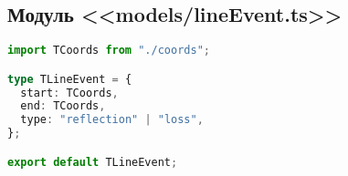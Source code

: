 \subsection{Модуль <<models/lineEvent.ts>>}
\begin{lstlisting}[language=typescript]
import TCoords from "./coords";

type TLineEvent = {
  start: TCoords,
  end: TCoords,
  type: "reflection" | "loss",
};

export default TLineEvent;
\end{lstlisting}
